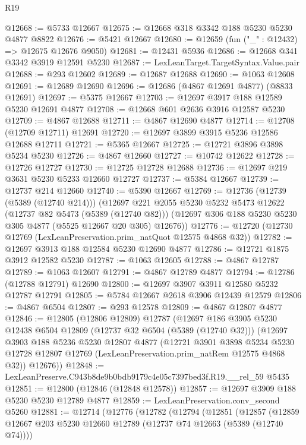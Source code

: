 \begin{lexlean}{R19}
\begin{coremodule}
@12668 := @5733 @12667
@12675 := @12668 @318 @3342 @188 @5230 @5230 @4877 @8822
@12676 := @5421 @12667
@12680 := @12659 (fun ("_" : @12432) => @12675 @12676 @9050)
@12681 := @12431 @5936
@12686 := @12668 @341 @3342 @3919 @12591 @5230
@12687 := LexLeanTarget.TargetSyntax.Value.pair
@12688 := @293 @12602
@12689 := @12687 @12688
@12690 := @1063 @12608
@12691 := @12689 @12690
@12696 := @12686 (@4867 @12691 @4877) (@8833 @12691)
@12697 := @5375 @12667
@12703 := @12697 @3917 @188 @12589 @5230 @12691 @4877
@12708 := @12668 @601 @2636 @3916 @12587 @5230
@12709 := @4867 @12688
@12711 := @4867 @12690 @4877
@12714 := @12708 (@12709 @12711) @12691
@12720 := @12697 @3899 @3915 @5236 @12586 @12688 @12711
@12721 := @5365 @12667
@12725 := @12721 @3896 @3898 @5234 @5230
@12726 := @4867 @12660
@12727 := @10742 @12622
@12728 := @12726 @12727
@12730 := @12725 @12728 @12688
@12736 := @12697 @219 @3631 @5230 @5233 @12660 @12727
@12737 := @5384 @12667
@12739 := @12737 @214 @12660
@12740 := @5390 @12667
@12769 := @12736
    (@12739 (@5389 (@12740 @214)))
    (@12697
      @221
      @2055
      @5230
      @5232
      @5473
      @12622
      (@12737 @82 @5473 (@5389 (@12740 @82)))
      (@12697 @306 @188 @5230 @5230 @305 @4877 (@5525 @12667 @20 @305) @12676))
@12776 := @12720 (@12730 @12769 (LexLeanPreservation.prim_natQuot @12575 @4868 @32))
@12782 := @12697 @3913 @188 @12584 @5230 @12690 @4877
@12786 := @12721 @1875 @3912 @12582 @5230
@12787 := @1063 @12605
@12788 := @4867 @12787
@12789 := @1063 @12607
@12791 := @4867 @12789 @4877
@12794 := @12786 (@12788 @12791) @12690
@12800 := @12697 @3907 @3911 @12580 @5232 @12787 @12791
@12805 := @5784 @12667 @2618 @3906 @12439 @12579
@12806 := @4867 @6504
@12807 := @293 @12578
@12809 := @4867 @12807 @4877
@12846 := @12805
    (@12806 @12809)
    @12787
    (@12697
      @186
      @3905
      @5230
      @12438
      @6504
      @12809
      (@12737 @32 @6504 (@5389 (@12740 @32)))
      (@12697
        @3903
        @188
        @5236
        @5230
        @12807
        @4877
        (@12721
          @3901
          @3898
          @5234
          @5230
          @12728
          @12807
          @12769
          (LexLeanPreservation.prim_natRem @12575 @4868 @32))
        @12676))
@12848 := LexLeanPreserve.C943b8de9b0bdb9179c4e05c7397bed3f.R19.__rel_59 @5435
@12851 := @12800 (@12846 (@12848 @12578))
@12857 := @12697 @3909 @188 @5230 @5230 @12789 @4877
@12859 := LexLeanPreservation.conv_second @5260
@12881 := @12714
    (@12776
      (@12782
        (@12794
          (@12851
            (@12857
              (@12859 @12667 @203 @5230 @12660 @12789 (@12737 @74 @12663 (@5389 (@12740 @74))))

\end{coremodule}
\end{lexlean}
